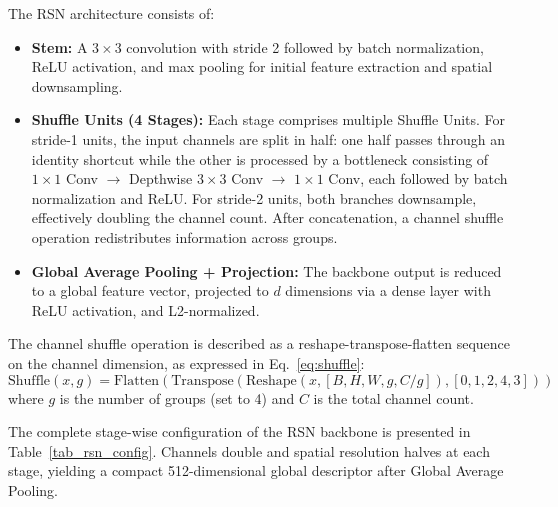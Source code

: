 \documentclass[pdflatex,sn-mathphys-num]{sn-jnl}
\theoremstyle{thmstyleone}%
\theoremstyle{thmstyletwo}%
\theoremstyle{thmstylethree}%
\begin{document}
The RSN architecture consists of:
\begin{itemize}
    \item \textbf{Stem:} A $3 \times 3$ convolution with stride 2 followed by batch normalization, ReLU activation, and max pooling for initial feature extraction and spatial downsampling.
    \item \textbf{Shuffle Units (4 Stages):} Each stage comprises multiple Shuffle Units. For stride-1 units, the input channels are split in half: one half passes through an identity shortcut while the other is processed by a bottleneck consisting of $1 \times 1$ Conv $\rightarrow$ Depthwise $3 \times 3$ Conv $\rightarrow$ $1 \times 1$ Conv, each followed by batch normalization and ReLU. For stride-2 units, both branches downsample, effectively doubling the channel count. After concatenation, a channel shuffle operation redistributes information across groups.
    \item \textbf{Global Average Pooling + Projection:} The backbone output is reduced to a global feature vector, projected to $d$ dimensions via a dense layer with ReLU activation, and L2-normalized.
\end{itemize}

The channel shuffle operation is described as a reshape-transpose-flatten sequence on the channel dimension, as expressed in Eq.~\eqref{eq:shuffle}:
\begin{equation}
\text{Shuffle}(x, g) = \text{Flatten}\left(\text{Transpose}\left(\text{Reshape}(x, [B, H, W, g, C/g]), [0,1,2,4,3]\right)\right)
\label{eq:shuffle}
\end{equation}
\noindent where $g$ is the number of groups (set to 4) and $C$ is the total channel count.

The complete stage-wise configuration of the RSN backbone is presented in Table~\ref{tab_rsn_config}. Channels double and spatial resolution halves at each stage, yielding a compact 512-dimensional global descriptor after Global Average Pooling.
\end{document}
